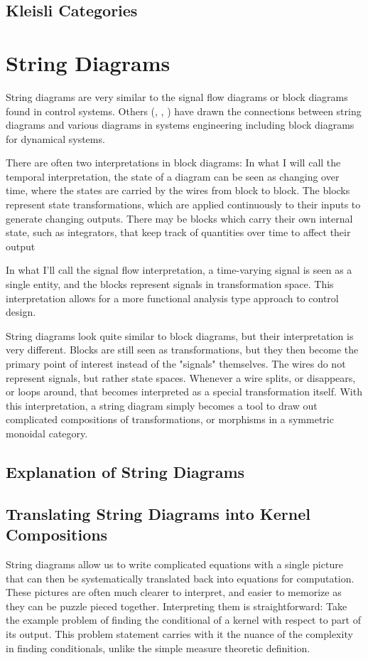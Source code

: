 \subsection{Kleisli Categories}

\section{String Diagrams}

String diagrams are very similar to the signal flow diagrams or block diagrams found in control systems.
Others (\cite{baez2015control}, \cite{fong2016thesis}, \cite{fong2016dynamicalsystems}) have drawn the connections between string diagrams and various diagrams in systems engineering including block diagrams for dynamical systems.

There are often two interpretations in block diagrams:
In what I will call the temporal interpretation, the state of a diagram can be seen as changing over time, where the states are carried by the wires from block to block. The blocks represent state transformations, which are applied continuously to their inputs to generate changing outputs.
There may be blocks which carry their own internal state, such as integrators, that keep track of quantities over time to affect their output

In what I'll call the signal flow interpretation, a time-varying signal is seen as a single entity, and the blocks represent signals in transformation space. This interpretation allows for a more functional analysis type approach to control design.

String diagrams look quite similar to block diagrams, but their interpretation is very different.
Blocks are still seen as transformations, but they then become the primary point of interest instead of the "signals" themselves.
The wires do not represent signals, but rather state spaces.
Whenever a wire splits, or disappears, or loops around, that becomes interpreted as a special transformation itself.
With this interpretation, a string diagram simply becomes a tool to draw out complicated compositions of transformations, or morphisms in a symmetric monoidal category.

\subsection{Explanation of String Diagrams}

\subsection{Translating String Diagrams into Kernel Compositions}
String diagrams allow us to write complicated equations with a single picture that can then be systematically translated back into equations for computation.
These pictures are often much clearer to interpret, and easier to memorize as they can be puzzle pieced together.
Interpreting them is straightforward: Take the example problem of finding the conditional of a kernel with respect to part of its output.
This problem statement carries with it the nuance of the complexity in finding conditionals, unlike the simple measure theoretic definition.

